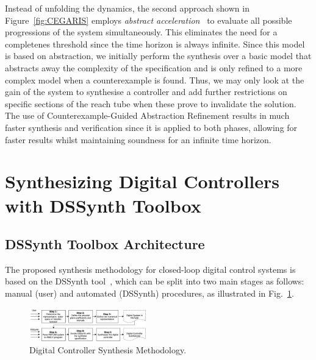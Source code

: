 \documentclass[10pt,conference]{IEEEtran}
\newcommand\tool{{DSSynth Toolbox}\xspace}
\begin{document}
Instead of unfolding the dynamics, the second approach shown in Figure~\ref{fig:CEGARIS}
employs {\em abstract acceleration}~\cite{cattaruzza2015unbounded} to
evaluate all possible progressions of the system simultaneously. This eliminates the need for
a completenes threshold since the time horizon is always infinite.
Since this model is based on abstraction, we initially perform the synthesis over a basic
model that abstracts away the complexity of the specification and is only refined to a more
complex model when a counterexample is found. Thus, we may only look at the gain of the
system to synthesise a controller and add further restrictions on specific sections of the reach
tube when these prove to invalidate the solution. The use of Counterexample-Guided 
Abstraction Refinement results in much faster synthesis and verification since it is applied to
both phases, allowing for faster results whilst maintaining soundness for an infinite time horizon.
 

\section{Synthesizing Digital Controllers with \tool}

\subsection{\tool Architecture}

The proposed synthesis methodology for closed-loop digital control
systems is based on the DSSynth tool~\cite{abate2017, abatecav2017}, 
which can be split into two main stages as follows: manual (user) and 
automated (DSSynth) procedures, as illustrated in Fig.~\ref{fig:synthesis-flow}. 
%
\begin{figure}[ht!]
\centering
\includegraphics[width=0.45\textwidth]{synthesis-flow.pdf}
\caption{Digital Controller Synthesis Methodology.}
\label{fig:synthesis-flow}
\end{figure}
\end{document}
